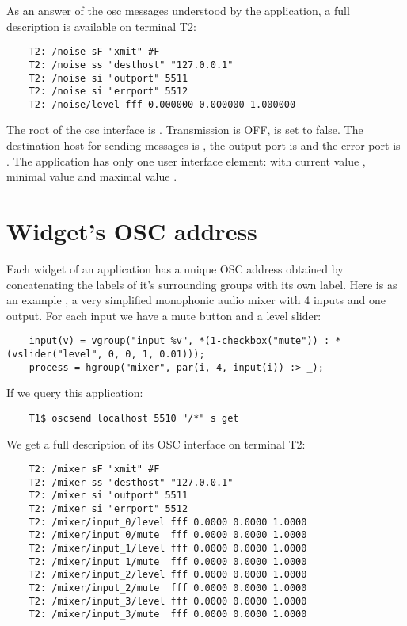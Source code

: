 As an answer of the osc messages  understood by the application, a full description is available on terminal T2:
\begin{lstlisting}
	T2: /noise sF "xmit" #F
	T2: /noise ss "desthost" "127.0.0.1"
	T2: /noise si "outport" 5511
	T2: /noise si "errport" 5512
	T2: /noise/level fff 0.000000 0.000000 1.000000
\end{lstlisting}

The root of the osc interface is . Transmission is OFF,  is set to false. The destination host for sending messages is , the output port is  and the error port is . The application has only one user interface element:  with current value , minimal value  and maximal value .



\section{Widget's OSC address}

Each widget of an application has a unique OSC address obtained by concatenating the labels of it's surrounding groups with its own label. 
Here is as an example , a very simplified monophonic audio mixer with 4 inputs and one output. For each input we have a mute button and a level slider:
\begin{lstlisting}
	input(v) = vgroup("input %v", *(1-checkbox("mute")) : *(vslider("level", 0, 0, 1, 0.01)));
	process = hgroup("mixer", par(i, 4, input(i)) :> _);
\end{lstlisting}
If we query this application:
\begin{lstlisting}
	T1$ oscsend localhost 5510 "/*" s get 
\end{lstlisting}

We get a full description of its OSC interface on terminal T2:
\begin{lstlisting}
	T2: /mixer sF "xmit" #F
	T2: /mixer ss "desthost" "127.0.0.1"
	T2: /mixer si "outport" 5511
	T2: /mixer si "errport" 5512
	T2: /mixer/input_0/level fff 0.0000 0.0000 1.0000
	T2: /mixer/input_0/mute  fff 0.0000 0.0000 1.0000
	T2: /mixer/input_1/level fff 0.0000 0.0000 1.0000
	T2: /mixer/input_1/mute  fff 0.0000 0.0000 1.0000
	T2: /mixer/input_2/level fff 0.0000 0.0000 1.0000
	T2: /mixer/input_2/mute  fff 0.0000 0.0000 1.0000
	T2: /mixer/input_3/level fff 0.0000 0.0000 1.0000
	T2: /mixer/input_3/mute  fff 0.0000 0.0000 1.0000
\end{lstlisting}

